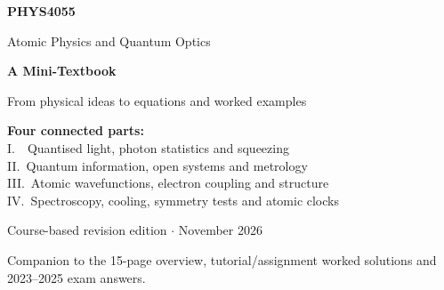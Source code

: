 \documentclass[11pt,a4paper]{article}
\begin{document}
\begin{titlepage}
\centering
\vspace*{18mm}
{\color{accent}\Huge\bfseries PHYS4055\par}
\vspace{8mm}
{\LARGE Atomic Physics and Quantum Optics\par}
\vspace{15mm}
{\huge\bfseries A Mini-Textbook\par}
\vspace{4mm}
{\Large From physical ideas to equations and worked examples\par}
\vspace{10mm}
\vspace{11mm}

\begin{minipage}{.88\textwidth}
\begin{methodbox}
\textbf{Four connected parts:}\\
I.\ \ Quantised light, photon statistics and squeezing\\
II.\ Quantum information, open systems and metrology\\
III.\ Atomic wavefunctions, electron coupling and structure\\
IV.\ Spectroscopy, cooling, symmetry tests and atomic clocks
\end{methodbox}
\end{minipage}
\vfill
{\large Course-based revision edition \(\cdot\) November 2026\par}
\vspace{4mm}
{\small Companion to the 15-page overview, tutorial/assignment
worked solutions and 2023--2025 exam answers.\par}
\end{titlepage}
\end{document}

